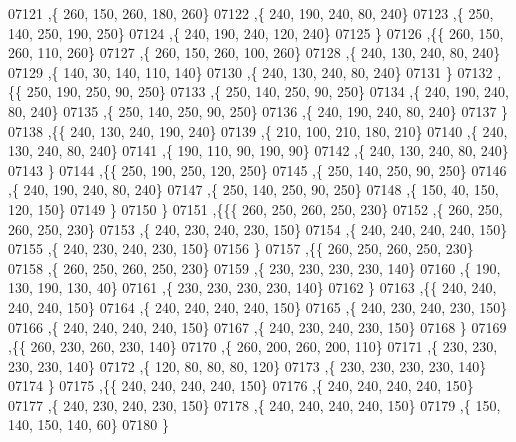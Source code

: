 \begin{DoxyCode}
07121     ,\{   260,   150,   260,   180,   260\}
07122     ,\{   240,   190,   240,    80,   240\}
07123     ,\{   250,   140,   250,   190,   250\}
07124     ,\{   240,   190,   240,   120,   240\}
07125     \}
07126    ,\{\{   260,   150,   260,   110,   260\}
07127     ,\{   260,   150,   260,   100,   260\}
07128     ,\{   240,   130,   240,    80,   240\}
07129     ,\{   140,    30,   140,   110,   140\}
07130     ,\{   240,   130,   240,    80,   240\}
07131     \}
07132    ,\{\{   250,   190,   250,    90,   250\}
07133     ,\{   250,   140,   250,    90,   250\}
07134     ,\{   240,   190,   240,    80,   240\}
07135     ,\{   250,   140,   250,    90,   250\}
07136     ,\{   240,   190,   240,    80,   240\}
07137     \}
07138    ,\{\{   240,   130,   240,   190,   240\}
07139     ,\{   210,   100,   210,   180,   210\}
07140     ,\{   240,   130,   240,    80,   240\}
07141     ,\{   190,   110,    90,   190,    90\}
07142     ,\{   240,   130,   240,    80,   240\}
07143     \}
07144    ,\{\{   250,   190,   250,   120,   250\}
07145     ,\{   250,   140,   250,    90,   250\}
07146     ,\{   240,   190,   240,    80,   240\}
07147     ,\{   250,   140,   250,    90,   250\}
07148     ,\{   150,    40,   150,   120,   150\}
07149     \}
07150    \}
07151   ,\{\{\{   260,   250,   260,   250,   230\}
07152     ,\{   260,   250,   260,   250,   230\}
07153     ,\{   240,   230,   240,   230,   150\}
07154     ,\{   240,   240,   240,   240,   150\}
07155     ,\{   240,   230,   240,   230,   150\}
07156     \}
07157    ,\{\{   260,   250,   260,   250,   230\}
07158     ,\{   260,   250,   260,   250,   230\}
07159     ,\{   230,   230,   230,   230,   140\}
07160     ,\{   190,   130,   190,   130,    40\}
07161     ,\{   230,   230,   230,   230,   140\}
07162     \}
07163    ,\{\{   240,   240,   240,   240,   150\}
07164     ,\{   240,   240,   240,   240,   150\}
07165     ,\{   240,   230,   240,   230,   150\}
07166     ,\{   240,   240,   240,   240,   150\}
07167     ,\{   240,   230,   240,   230,   150\}
07168     \}
07169    ,\{\{   260,   230,   260,   230,   140\}
07170     ,\{   260,   200,   260,   200,   110\}
07171     ,\{   230,   230,   230,   230,   140\}
07172     ,\{   120,    80,    80,    80,   120\}
07173     ,\{   230,   230,   230,   230,   140\}
07174     \}
07175    ,\{\{   240,   240,   240,   240,   150\}
07176     ,\{   240,   240,   240,   240,   150\}
07177     ,\{   240,   230,   240,   230,   150\}
07178     ,\{   240,   240,   240,   240,   150\}
07179     ,\{   150,   140,   150,   140,    60\}
07180     \}

\end{DoxyCode}

